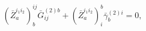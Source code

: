 \begin{equation}
\left( \bar{Z}_{a}^{i_{1}i_{2}}\right) _{b}^{ij}\bar{G}_{ij}^{(2)b}+\left(
\bar{Z}_{a}^{i_{1}i_{2}}\right) _{i}^{b}\bar{\gamma}_{b}^{(2)i}=0,
\label{i13}
\end{equation}

